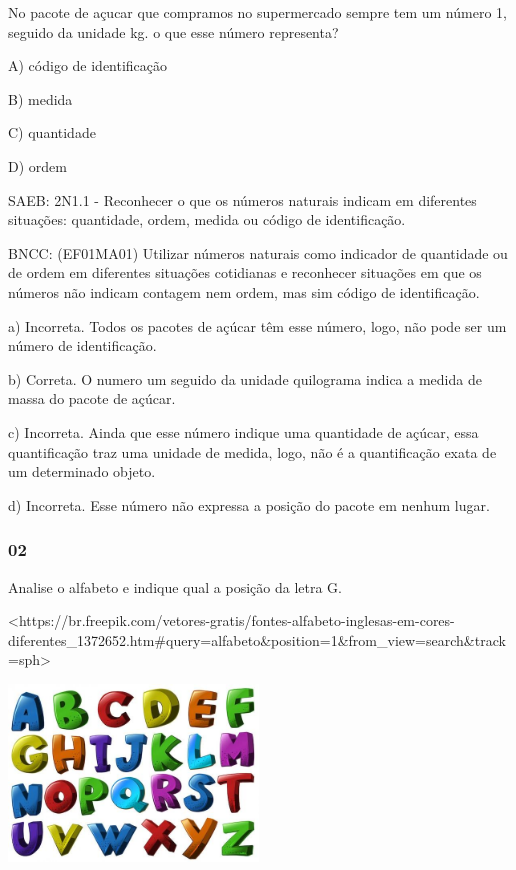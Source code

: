 No pacote de açucar que compramos no supermercado sempre tem um número
1, seguido da unidade kg. o que esse número representa?

A) código de identificação

B) medida

C) quantidade

D) ordem

SAEB: 2N1.1 - Reconhecer o que os números naturais indicam em diferentes
situações: quantidade, ordem, medida ou código de identificação.

BNCC: (EF01MA01) Utilizar números naturais como indicador de quantidade
ou de ordem em diferentes situações cotidianas e reconhecer situações em
que os números não indicam contagem nem ordem, mas sim código de
identificação.

a) Incorreta. Todos os pacotes de açúcar têm esse número, logo, não pode
ser um número de identificação.

b) Correta. O numero um seguido da unidade quilograma indica a medida de
massa do pacote de açúcar.

c) Incorreta. Ainda que esse número indique uma quantidade de açúcar,
essa quantificação traz uma unidade de medida, logo, não é a
quantificação exata de um determinado objeto.

d) Incorreta. Esse número não expressa a posição do pacote em nenhum
lugar.

\subsubsection{02}\label{section-88}

Analise o alfabeto e indique qual a posição da letra G.

\textless{}https://br.freepik.com/vetores-gratis/fontes-alfabeto-inglesas-em-cores-diferentes\_1372652.htm\#query=alfabeto\&position=1\&from\_view=search\&track=sph\textgreater{}

\includegraphics[width=2.61848in,height=1.85732in]{media/image106.jpg}

